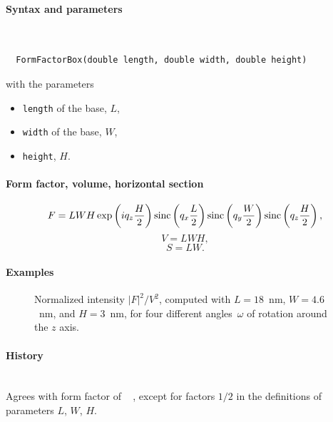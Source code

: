 \paragraph{Syntax and parameters}\strut\\[-2ex plus .2ex minus .2ex]
\begin{lstlisting}
  FormFactorBox(double length, double width, double height)
\end{lstlisting}
with the parameters
\begin{itemize}
\item \texttt{length} of the base, $L$,
\item \texttt{width} of the base, $W$,
\item \texttt{height}, $H$.
\end{itemize}

\paragraph{Form factor, volume, horizontal section}

\begin{equation*}
F= L W H\exp\left(i q_z \frac{H}{2}\right) \operatorname{sinc}\left(q_x \frac{L}{2}\right)
\operatorname{sinc}\left(q_y \frac{W}{2}\right) \operatorname{sinc}\left(q_z \frac{H}{2}\right),
\end{equation*}
\begin{equation*}
  V= LWH,
\end{equation*}
\begin{equation*}
  S = LW.
\end{equation*}

\paragraph{Examples}\strut

\begin{figure}[H]
\begin{center}
\end{center}
\caption{Normalized intensity $|F|^2/V^2$,
computed with $L=18$~nm, $W=4.6$~nm, and $H=3$~nm,
for four different angles~$\omega$ of rotation around the $z$ axis.}
\end{figure}

\paragraph{History}\strut\\
Agrees with  form factor of \IsGISAXS\
\cite[Eq.~2.38]{Laz08} \cite[Eq.~214]{ReLL09},
except for factors $1/2$ in the definitions of parameters $L$, $W$, $H$.


